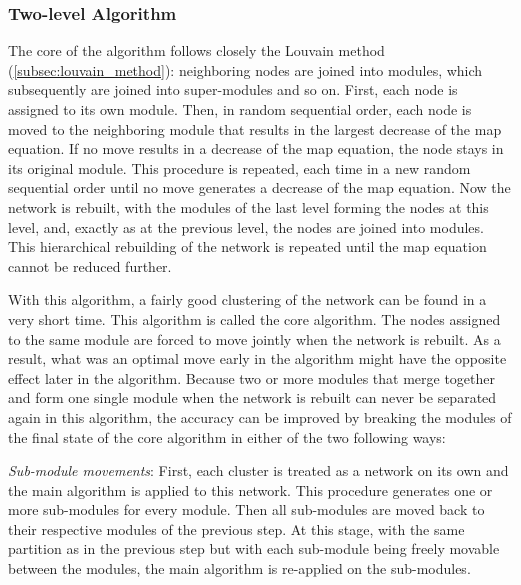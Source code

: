 \subsubsection*{Two-level Algorithm}\label{subsubsec:two_level_algorithm}
The core of the algorithm follows closely the Louvain method (\ref{subsec:louvain_method}): neighboring nodes are joined into modules, which subsequently are joined into super-modules and so on. First, each node is assigned to its own module. Then, in random sequential order, each node is moved to the neighboring module that results in the largest decrease of the map equation. If no move results in a decrease of the map equation, the node stays in its original module. This procedure is repeated, each time in a new random sequential order until no move generates a decrease of the map equation. Now the network is rebuilt, with the modules of the last level forming the nodes at this level, and, exactly as at the previous level, the nodes are joined into modules. This hierarchical rebuilding of the network is repeated until the map equation cannot be reduced further.

With this algorithm, a fairly good clustering of the network can be found in a very short time. This algorithm is called the core algorithm. The nodes assigned to the same module are forced to move jointly when the network is rebuilt. As a result, what was an optimal move early in the algorithm might have the opposite effect later in the algorithm. Because two or more modules that merge together and form one single module when the network is rebuilt can never be separated again in this algorithm, the accuracy can be improved by breaking the modules of the final state of the core algorithm in either of the two following ways:

\textit{Sub-module movements}: First, each cluster is treated as a network on its own and the main algorithm is applied to this network. This procedure generates one or more sub-modules for every module. Then all sub-modules are moved back to their respective modules of the previous step. At this stage, with the same partition as in the previous step but with each sub-module being freely movable between the modules, the main algorithm is re-applied on the sub-modules.

